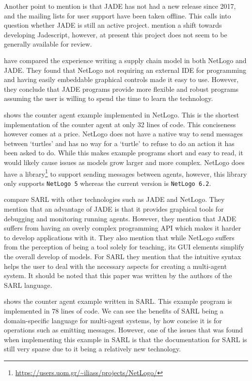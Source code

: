 Another point to mention is that JADE has not had a new release since 2017, and the mailing lists for user support have been taken offline.
This calls into question whether JADE is still an active project.
 mention a shift towards developing Jadescript, however, at present this project does not seem to be generally available for review.

 have compared the experience writing a supply chain model in both NetLogo and JADE\@.
They found that NetLogo not requiring an external IDE for programming and having easily embeddable graphical controls made it easy to use.
However, they conclude that JADE programs provide more flexible and robust programs assuming the user is willing to spend the time to learn the technology.

 shows the counter agent example implemented in NetLogo.
This is the shortest implementation of the counter agent at only 32 lines of code.
This conciseness however comes at a price.
NetLogo does not have a native way to send messages between `turtles' and has no way for a `turtle' to refuse to do an action it has been asked to do.
While this makes example programs short and easy to read, it would likely cause issues as models grow larger and more complex.
NetLogo does have a library\footnote{\url{https://users.uom.gr/~iliass/projects/NetLogo/}} to support sending messages between agents, however, this library only supports \verb|NetLogo 5| whereas the current version is \verb|NetLogo 6.2|.~\cite{sakellariou2008enhancing}

 compare SARL with other technologies such as JADE and NetLogo.
They mention that an advantage of JADE is that it provides graphical tools for debugging and monitoring running agents.
However, they mention that JADE suffers from having an overly complex programming API which makes it harder to develop applications with it.
They also mention that while NetLogo suffers from the perception of being a tool solely for teaching, its GUI elements simplify the overall develop of models.
For SARL they mention that the intuitive syntax helps the user to deal with the necessary aspects for creating a multi-agent system.
It should be noted that this paper was written by the authors of the SARL language.

 shows the counter agent example written in SARL\@.
This example program is implemented in 78 lines of code.
We can see the benefits of SARL being a domain-specific language for multi-agent systems, by how concise it is for operations such as emitting messages.
However, one of the issues that was found when implementing this example in SARL is that the documentation for SARL is still very sparse due to it being a relatively new technology.

